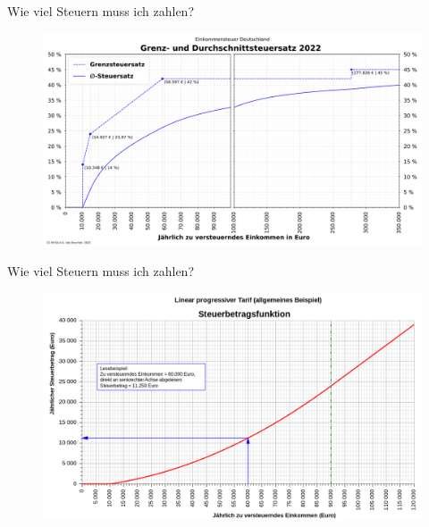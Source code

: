 \documentclass{beamer}
\begin{document}
		
			\begin{frame}{Wie viel Steuern muss ich zahlen?}
				\begin{center}
					\vspace{-0.5cm}
					\begin{figure}
						\includegraphics[width=0.9\linewidth]{images/tarifzonen-diagramm}
					\end{figure}
				\end{center}
			\end{frame}
			
			\begin{frame}{Wie viel Steuern muss ich zahlen?}
				\begin{center}
					\vspace{-0.5cm}
					\begin{figure}
						\includegraphics[width=0.9\linewidth]{images/tarifzonen-steuerfunktion-diagramm}
					\end{figure}
				\end{center}
			\end{frame}
			
\end{document}
